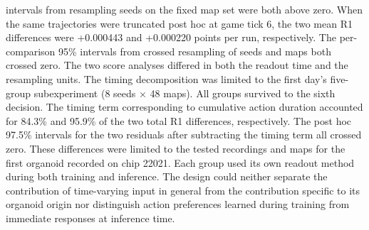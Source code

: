 \documentclass{article}
\begin{document}
intervals from resampling seeds on the fixed map set were both above zero. When the same trajectories were truncated post hoc at game tick 6, the two mean R1 differences were +0.000443 and +0.000220 points per run, respectively. The per-comparison 95\% intervals from crossed resampling of seeds and maps both crossed zero. The two score analyses differed in both the readout time and the resampling units. The timing decomposition was limited to the first day's five-group subexperiment (8 seeds \ensuremath{\times} 48 maps). All groups survived to the sixth decision. The timing term corresponding to cumulative action duration accounted for 84.3\% and 95.9\% of the two total R1 differences, respectively. The post hoc 97.5\% intervals for the two residuals after subtracting the timing term all crossed zero. These differences were limited to the tested recordings and maps for the first organoid recorded on chip 22021. Each group used its own readout method during both training and inference. The design could neither separate the contribution of time-varying input in general from the contribution specific to its organoid origin nor distinguish action preferences learned during training from immediate responses at inference time.
\end{document}

